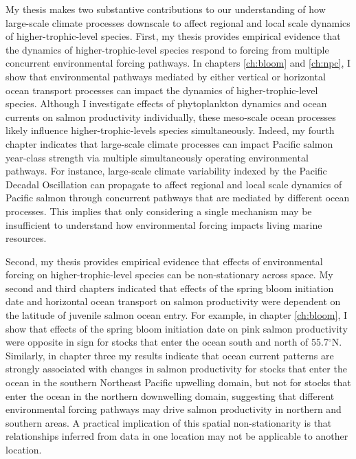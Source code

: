 My thesis makes two substantive contributions to our understanding of how
large-scale climate processes downscale to affect regional and local scale
dynamics of higher-trophic-level species. First, my thesis provides empirical
evidence that the dynamics of higher-trophic-level species respond to forcing
from multiple concurrent environmental forcing pathways. In chapters
\ref{ch:bloom} and \ref{ch:npc}, I show that environmental pathways mediated by
either vertical or horizontal ocean transport processes can impact the dynamics
of higher-trophic-level species. Although I investigate effects of phytoplankton
dynamics and ocean currents on salmon productivity individually, these
meso-scale ocean processes likely influence higher-trophic-levels species
simultaneously. Indeed, my fourth chapter indicates that large-scale climate
processes can impact Pacific salmon year-class strength via multiple
simultaneously operating environmental pathways. For instance, large-scale
climate variability indexed by the Pacific Decadal Oscillation can propagate to
affect regional and local scale dynamics of Pacific salmon through concurrent
pathways that are mediated by different ocean processes. This implies that only
considering a single mechanism may be insufficient to understand how
environmental forcing impacts living marine resources.

Second, my thesis provides empirical evidence that effects of environmental
forcing on higher-trophic-level species can be non-stationary across space. My
second and third chapters indicated that effects of the spring bloom initiation
date and horizontal ocean transport on salmon productivity were dependent on the
latitude of juvenile salmon ocean entry. For example, in chapter \ref{ch:bloom},
I show that effects of the spring bloom initiation date on pink salmon
productivity were opposite in sign for stocks that enter the ocean south and
north of 55.7$^{\circ}$N. Similarly, in chapter three my results indicate that
ocean current patterns are strongly associated with changes in salmon
productivity for stocks that enter the ocean in the southern Northeast Pacific
upwelling domain, but not for stocks that enter the ocean in the northern
downwelling domain, suggesting that different environmental forcing pathways may
drive salmon productivity in northern and southern areas. A practical
implication of this spatial non-stationarity is that relationships inferred from
data in one location may not be applicable to another location.


